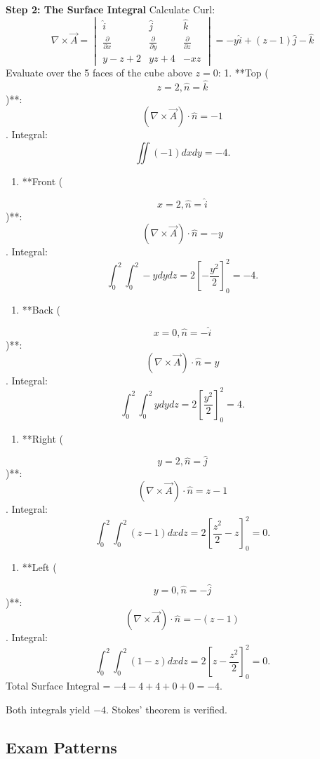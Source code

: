 \documentclass[
]{article}
\providecommand{\tightlist}{%
  \setlength{\itemsep}{0pt}\setlength{\parskip}{0pt}}
\begin{document}
\textbf{Step 2: The Surface Integral} Calculate Curl:
\[
\nabla \times \vec{A} =
\begin{vmatrix}
\hat{i} & \hat{j} & \hat{k} \\
\frac{\partial}{\partial x} & \frac{\partial}{\partial y} & \frac{\partial}{\partial z} \\
y-z+2 & yz+4 & -xz
\end{vmatrix} = -y\hat{i} + (z - 1)\hat{j} - \hat{k}
\]
Evaluate over the 5 faces of the cube above \(z=0\): 1. **Top (
\[
z=2, \hat{n}=\hat{k}
\]
)**:
\[
(\nabla \times \vec{A}) \cdot \hat{n} = -1
\]
. Integral:
\[
\iint (-1) dxdy = -4.
\]
\begin{enumerate}
\def\labelenumi{\arabic{enumi}.}
\setcounter{enumi}{1}
\tightlist
\item
  **Front (
\end{enumerate}
\[
x=2, \hat{n}=\hat{i}
\]
)**:
\[
(\nabla \times \vec{A}) \cdot \hat{n} = -y
\]
. Integral:
\[
\int_0^2\int_0^2 -y dydz = 2\left[-\frac{y^2}{2}\right]_0^2 = -4.
\]
\begin{enumerate}
\def\labelenumi{\arabic{enumi}.}
\setcounter{enumi}{2}
\tightlist
\item
  **Back (
\end{enumerate}
\[
x=0, \hat{n}=-\hat{i}
\]
)**:
\[
(\nabla \times \vec{A}) \cdot \hat{n} = y
\]
. Integral:
\[
\int_0^2\int_0^2 y dydz = 2\left[\frac{y^2}{2}\right]_0^2 = 4.
\]
\begin{enumerate}
\def\labelenumi{\arabic{enumi}.}
\setcounter{enumi}{3}
\tightlist
\item
  **Right (
\end{enumerate}
\[
y=2, \hat{n}=\hat{j}
\]
)**:
\[
(\nabla \times \vec{A}) \cdot \hat{n} = z-1
\]
. Integral:
\[
\int_0^2\int_0^2 (z-1) dxdz = 2\left[\frac{z^2}{2}-z\right]_0^2 = 0.
\]
\begin{enumerate}
\def\labelenumi{\arabic{enumi}.}
\setcounter{enumi}{4}
\tightlist
\item
  **Left (
\end{enumerate}
\[
y=0, \hat{n}=-\hat{j}
\]
)**:
\[
(\nabla \times \vec{A}) \cdot \hat{n} = -(z-1)
\]
. Integral:
\[
\int_0^2\int_0^2 (1-z) dxdz = 2\left[z-\frac{z^2}{2}\right]_0^2 = 0.
\]
Total Surface Integral = \(-4 - 4 + 4 + 0 + 0 = -4\).

Both integrals yield \(-4\). Stokes' theorem is verified.

\subsection{Exam Patterns}\label{exam-patterns-15}
\end{document}
